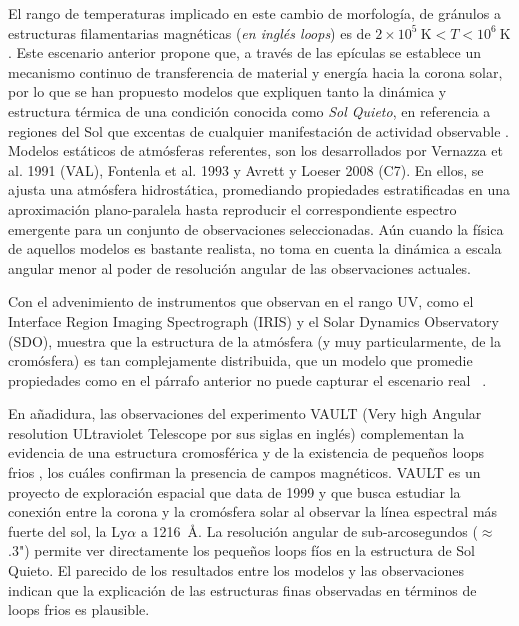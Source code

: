
El rango de temperaturas implicado en este cambio de morfolog\'ia, de gr\'anulos a estructuras filamentarias magn\'eticas (\emph{en ingl\'es loops}) es de $2\times 10^5~\mbox{K} < T < 10^6~\mbox{K}$. Este escenario anterior propone que, a trav\'es de las ep\'iculas se establece un mecanismo continuo de transferencia de material y energ\'ia hacia la corona solar, por lo que se han propuesto modelos que expliquen tanto la din\'amica y estructura t\'ermica de una condici\'on conocida como \emph{Sol Quieto}, en referencia a regiones del Sol que excentas de cualquier manifestaci\'on de actividad observable \citep{ashwanden}. Modelos est\'aticos de atm\'osferas referentes, son los desarrollados por Vernazza et al. 1991 (VAL), Fontenla et al. 1993 y Avrett y Loeser 2008 (C7). En ellos, se ajusta una atm\'osfera hidrost\'atica, promediando propiedades estratificadas en una aproximaci\'on plano-paralela hasta reproducir el correspondiente espectro emergente para un conjunto de observaciones seleccionadas. A\'un cuando la f\'isica de aquellos modelos es bastante realista, no toma en cuenta la din\'amica a escala angular menor al poder de resoluci\'on angular de las observaciones actuales.

Con el advenimiento de instrumentos que observan en el rango UV, como el Interface Region Imaging Spectrograph (IRIS) y el Solar Dynamics Observatory (SDO), muestra que la estructura de la atm\'osfera (y muy particularmente, de la crom\'osfera) es tan complejamente distribuida, que un modelo que promedie propiedades como en el p\'arrafo anterior no puede capturar el escenario real ~\citep{VAULT1}. 

En a\~nadidura, las  observaciones del experimento VAULT (Very high Angular resolution ULtraviolet Telescope por sus siglas en ingl\'es) complementan la evidencia de una estructura cromosf\'erica y de la existencia de peque\~nos loops frios \citep{VAULT1}, los cu\'ales confirman la presencia de campos magn\'eticos.
VAULT es un proyecto de exploraci\'on espacial que data de 1999 y que busca estudiar la conexi\'on entre la corona y la crom\'osfera solar al observar la l\'inea espectral m\'as fuerte del sol, la Ly$\alpha$ a 1216~$\mbox{\AA}$.
La resoluci\'on angular de sub-arcosegundos ($\approx$.3") permite ver directamente los peque\~nos loops f\'ios en la estructura de Sol Quieto. El parecido de los resultados entre los modelos y las observaciones indican que la explicaci\'on de las estructuras finas observadas en t\'erminos de loops frios es plausible.

